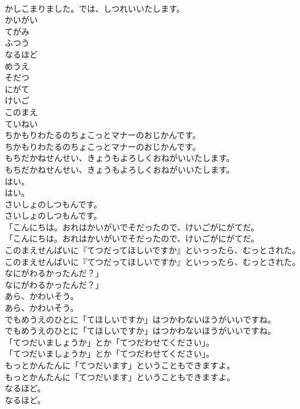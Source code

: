 \documentclass[8pt]{extreport}
\begin{document}
\begin{CJK}{UTF8}{min}
\\	かしこまりました。では、しつれいいたします。
\\	かいがい
\\	てがみ
\\	ふつう
\\	なるほど
\\	めうえ
\\	そだつ
\\	にがて
\\	けいご
\\	このまえ
\\	ていねい
\\	ちかもりわたるのちょこっとマナーのおじかんです。
\\	ちかもりわたるのちょこっとマナーのおじかんです。
\\	もちだかねせんせい、きょうもよろしくおねがいいたします。
\\	もちだかねせんせい、きょうもよろしくおねがいいたします。
\\	はい。
\\	はい。
\\	さいしょのしつもんです。
\\	さいしょのしつもんです。
\\	「こんにちは。おれはかいがいでそだったので、けいごがにがてだ。
\\	「こんにちは。おれはかいがいでそだったので、けいごがにがてだ。
\\	このまえせんぱいに『てつだってほしいですか』といっったら、むっとされた。
\\	このまえせんぱいに『てつだってほしいですか』といっったら、むっとされた。
\\	なにがわるかったんだ？」
\\	なにがわるかったんだ？」
\\	あら、かわいそう。
\\	あら、かわいそう。
\\	でもめうえのひとに「てほしいですか」はつかわないほうがいいですね。
\\	でもめうえのひとに「てほしいですか」はつかわないほうがいいですね。
\\	「てつだいましょうか」とか「てつだわせてください」。
\\	「てつだいましょうか」とか「てつだわせてください」。
\\	もっとかんたんに「てつだいます」ということもできますよ。
\\	もっとかんたんに「てつだいます」ということもできますよ。
\\	なるほど。
\\	なるほど。

\end{CJK}
\end{document}
